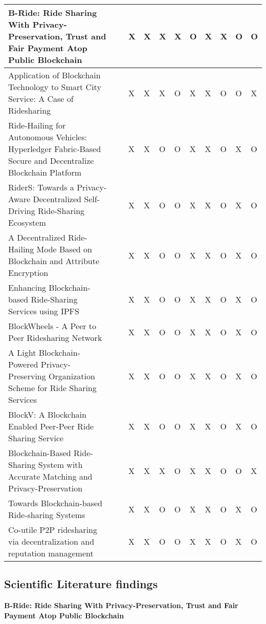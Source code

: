 \begin{longtable}{p{5cm}l||l|l|l|l|l|l|l|l|l}
B-Ride: Ride Sharing With Privacy-Preservation, Trust and Fair Payment Atop Public Blockchain & ~\cite{Baza.2021} & X & X & X & X & O & X & X & O & O \\
\hline
Application of Blockchain Technology to Smart City Service: A Case of Ridesharing & ~\cite{Chang.} & X & X & X & O & X & X & O & O & X \\
\hline
Ride-Hailing for Autonomous Vehicles: Hyperledger Fabric-Based Secure and Decentralize Blockchain Platform & ~\cite{Shivers.} & X & X & O & O & X & X & O & X & O \\
\hline
RiderS: Towards a Privacy-Aware Decentralized Self-Driving Ride-Sharing Ecosystem & ~\cite{Bathen.} & X & X & O & O & X & X & O & X & O \\
\hline
A Decentralized Ride-Hailing Mode Based on Blockchain and Attribute Encryption & ~\cite{Zhang.} & X & X & O & O & X & X & O & X & O \\
\hline
Enhancing Blockchain-based Ride-Sharing Services using IPFS & ~\cite{Mahmoud.2022} & X & X & O & O & X & X & O & X & O \\
\hline
BlockWheels - A Peer to Peer Ridesharing Network & ~\cite{Joseph.} & X & X & O & O & X & X & O & X & O \\
\hline
A Light Blockchain-Powered Privacy-Preserving Organization Scheme for Ride Sharing Services & ~\cite{Baza.52520205282020} & X & X & O & O & X & X & O & X & O \\
\hline
\pagebreak
BlockV: A Blockchain Enabled Peer-Peer Ride Sharing Service & ~\cite{Pal.} & X & X & O & O & X & X & O & X & O \\
\hline
Blockchain-Based Ride-Sharing System with Accurate Matching and Privacy-Preservation & ~\cite{Badr.} & X & X & X & O & X & X & O & O & X  \\
\hline
Towards Blockchain-based Ride-sharing Systems & ~\cite{Vazquez.} & X & X & O & O & X & X & O & X & O \\
\hline
Co-utile P2P ridesharing via decentralization and reputation management & ~\cite{Sanchez.2016} & X & X & O & O & X & X & O & X & O \\
\hline
\end{longtable}

\subsection{Scientific Literature findings}


\textbf{B-Ride: Ride Sharing With Privacy-Preservation, Trust and Fair Payment Atop Public Blockchain}

